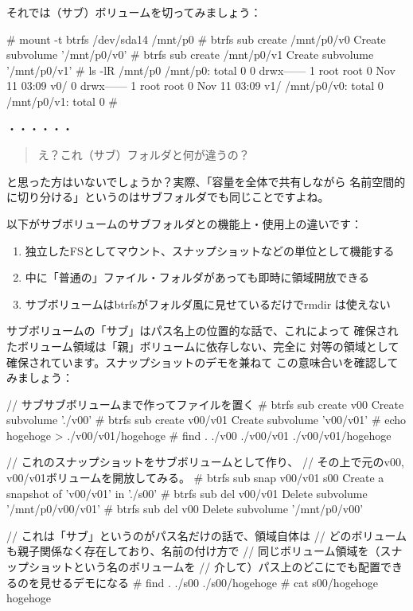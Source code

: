 \documentclass[mingoth,a4paper]{jsarticle}
\begin{document}
それでは（サブ）ボリュームを切ってみましょう：
\begin{commandline}
# mount -t btrfs /dev/sda14 /mnt/p0
# btrfs sub create /mnt/p0/v0
Create subvolume '/mnt/p0/v0'
# btrfs sub create /mnt/p0/v1
Create subvolume '/mnt/p0/v1'
# ls -lR /mnt/p0
/mnt/p0:
total 0
0 drwx------ 1 root root 0 Nov 11 03:09 v0/
0 drwx------ 1 root root 0 Nov 11 03:09 v1/
/mnt/p0/v0:
total 0
/mnt/p0/v1:
total 0
#
\end{commandline}

・・・・・・
\begin{quote}
\Large{え？これ（サブ）フォルダと何が違うの？}
\end{quote}
と思った方はいないでしょうか？実際、「容量を全体で共有しながら
名前空間的に切り分ける」というのはサブフォルダでも同じことですよね。

以下がサブボリュームのサブフォルダとの機能上・使用上の違いです：
\begin{enumerate}
\item 独立したFSとしてマウント、スナップショットなどの単位として機能する
\item 中に「普通の」ファイル・フォルダがあっても即時に領域開放できる
\item サブボリュームはbtrfsがフォルダ風に見せているだけでrmdir は使えない
\end{enumerate}

サブボリュームの「サブ」はパス名上の位置的な話で、これによって
確保されたボリューム領域は「親」ボリュームに依存しない、完全に
対等の領域として確保されています。スナップショットのデモを兼ねて
この意味合いを確認してみましょう：
\begin{commandline}
// サブサブボリュームまで作ってファイルを置く
# btrfs sub create v00
Create subvolume './v00'
# btrfs sub create v00/v01
Create subvolume 'v00/v01'
# echo hogehoge > ./v00/v01/hogehoge
# find
.
./v00
./v00/v01
./v00/v01/hogehoge

// これのスナップショットをサブボリュームとして作り、
// その上で元のv00, v00/v01ボリュームを開放してみる。
# btrfs sub snap v00/v01 s00
Create a snapshot of 'v00/v01' in './s00'
# btrfs sub del v00/v01
Delete subvolume '/mnt/p0/v00/v01'
# btrfs sub del v00
Delete subvolume '/mnt/p0/v00'

// これは「サブ」というのがパス名だけの話で、領域自体は
// どのボリュームも親子関係なく存在しており、名前の付け方で
// 同じボリューム領域を（スナップショットという名のボリュームを
// 介して）パス上のどこにでも配置できるのを見せるデモになる
# find
.
./s00
./s00/hogehoge
# cat s00/hogehoge
hogehoge
\end{commandline}
\end{document}
